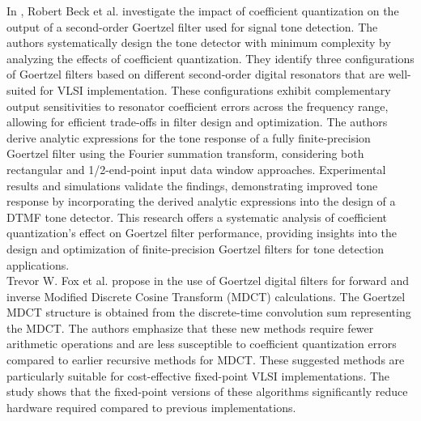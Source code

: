 In \cite{958339}, Robert Beck et al. investigate the impact of coefficient quantization on the output of a second-order Goertzel filter used for signal tone detection. The authors systematically design the tone detector with minimum complexity by analyzing the effects of coefficient quantization. They identify three configurations of Goertzel filters based on different second-order digital resonators that are well-suited for VLSI implementation. These configurations exhibit complementary output sensitivities to resonator coefficient errors across the frequency range, allowing for efficient trade-offs in filter design and optimization. The authors derive analytic expressions for the tone response of a fully finite-precision Goertzel filter using the Fourier summation transform, considering both rectangular and 1/2-end-point input data window approaches. Experimental results and simulations validate the findings, demonstrating improved tone response by incorporating the derived analytic expressions into the design of a DTMF tone detector. This research offers a systematic analysis of coefficient quantization's effect on Goertzel filter performance, providing insights into the design and optimization of finite-precision Goertzel filters for tone detection applications.\\

Trevor W. Fox et al. propose in \cite{1347723} the use of Goertzel digital filters for forward and inverse Modified Discrete Cosine Transform (MDCT) calculations. The Goertzel MDCT structure is obtained from the discrete-time convolution sum representing the MDCT. The authors emphasize that these new methods require fewer arithmetic operations and are less susceptible to coefficient quantization errors compared to earlier recursive methods for MDCT. These suggested methods are particularly suitable for cost-effective fixed-point VLSI implementations. The study shows that the fixed-point versions of these algorithms significantly reduce hardware required compared to previous implementations.

